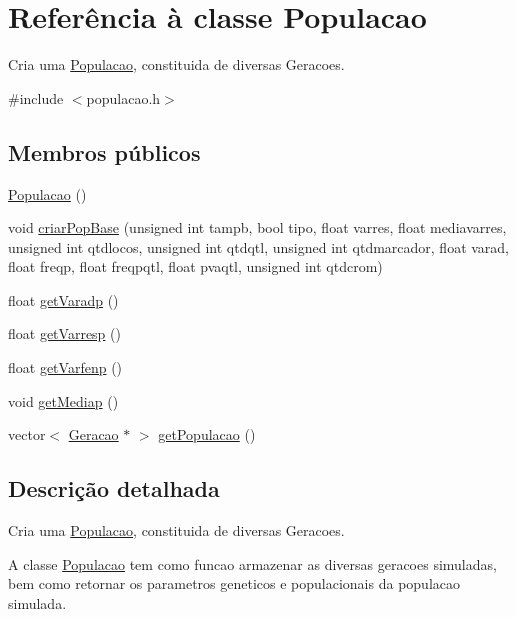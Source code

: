 \hypertarget{class_populacao}{\section{\-Referência à classe \-Populacao}
\label{class_populacao}
}


\-Cria uma \hyperlink{class_populacao}{\-Populacao}, constituida de diversas \-Geracoes.  




{\ttfamily \#include $<$populacao.\-h$>$}

\subsection*{\-Membros públicos}
\begin{DoxyCompactItemize}
\item 
\hyperlink{class_populacao_ae2b9a4937784998ba732c1453fd1a853}{\-Populacao} ()
\item 
void \hyperlink{class_populacao_a57906fb73eaed4b1eac941d70bd0d9f7}{criar\-Pop\-Base} (unsigned int tampb, bool tipo, float varres, float mediavarres, unsigned int qtdlocos, unsigned int qtdqtl, unsigned int qtdmarcador, float varad, float freqp, float freqpqtl, float pvaqtl, unsigned int qtdcrom)
\item 
float \hyperlink{class_populacao_aa736b42ac4cee186b3f514aec450c168}{get\-Varadp} ()
\item 
float \hyperlink{class_populacao_a48c6fab00206de43f4acae14ae41fd5c}{get\-Varresp} ()
\item 
float \hyperlink{class_populacao_aacb032a00ede3afa9f52a8603abe2ad9}{get\-Varfenp} ()
\item 
void \hyperlink{class_populacao_a1d9fa2673abedcc8b9e69c26fc98f8db}{get\-Mediap} ()
\item 
vector$<$ \hyperlink{class_geracao}{\-Geracao} $\ast$ $>$ \hyperlink{class_populacao_aa7b77ecfe5f2f555887191a324dcd562}{get\-Populacao} ()
\end{DoxyCompactItemize}


\subsection{\-Descrição detalhada}
\-Cria uma \hyperlink{class_populacao}{\-Populacao}, constituida de diversas \-Geracoes. 

\-A classe \hyperlink{class_populacao}{\-Populacao} tem como funcao armazenar as diversas geracoes simuladas, bem como retornar os parametros geneticos e populacionais da populacao simulada. 

